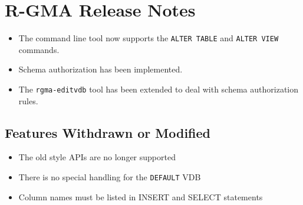 \section{R{}-GMA Release Notes}
\label{sec:release}

\begin{itemize}
  \item The command line tool now supports the \texttt{ALTER TABLE} and
  \texttt{ALTER VIEW} commands.
  \item Schema authorization has been implemented.
  \item The
  \texttt{rgma-editvdb} tool has been extended to deal with schema authorization
  rules.
\end{itemize}


\subsection{Features Withdrawn or Modified}
\begin{itemize}
  \item The old style APIs are no longer  supported
  \item There is no special handling for the \texttt{DEFAULT} VDB
  \item Column names must be listed in INSERT and SELECT statements
\end{itemize}
  

